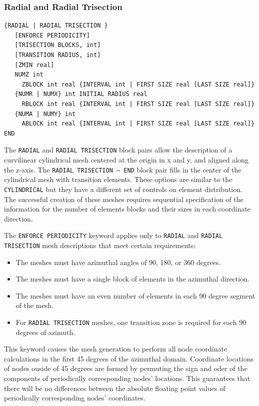 \clearpage
\subsubsection {Radial and Radial Trisection}
{\ttfamily \begin{verbatim}
{RADIAL | RADIAL TRISECTION }
   [ENFORCE PERIODICITY]
   [TRISECTION BLOCKS, int]
   [TRANSITION RADIUS, int]
   [ZMIN real]
   NUMZ int
     ZBLOCK int real {INTERVAL int | FIRST SIZE real [LAST SIZE real]}
   {NUMR | NUMX} int INITIAL RADIUS real 
     RBLOCK int real {INTERVAL int | FIRST SIZE real [LAST SIZE real]}
   {NUMA | NUMY} int
     ABLOCK int real {INTERVAL int | FIRST SIZE real [LAST SIZE real]}
END
\end{verbatim}
}

The \texttt{RADIAL} and \texttt{RADIAL TRISECTION} block pairs allow the description of
a
curvilinear cylindrical mesh centered at the origin in x and y, and
aligned along the z-axis.  The \texttt{RADIAL TRISECTION -- END}
block pair fills in the center of the cylindrical mesh with transition
elements.  These options are similar to the \texttt{CYLINDRICAL}
but they have a different set of controls on element distribution.  The
successful creation of these meshes requires sequential
specification of the information for the number of elements blocks and
their sizes in each coordinate direction. 

The \texttt{ENFORCE PERIODICITY} keyword applies only to \texttt{RADIAL} and \texttt{RADIAL TRISECTION} mesh descriptions that meet certain requirements: 
\begin{itemize}
  	\item The meshes must have azimuthal angles of 90, 180, or 360 degrees.
	\item The meshes must have a single block of elements in the azimuthal direction. 
	\item The meshes must have an even number of elements in each 90 degree segment of the mesh. 
	\item For \texttt{RADIAL TRISECTION} meshes, one transition zone is required for each 90 degrees of azimuth. 
\end{itemize} 

This keyword causes the mesh generation to perform all node coordinate calculations in the first 45 degrees of the azimuthal domain. Coordinate locations of nodes ouside of 45 degrees are formed by permuting the sign and oder of the components of periodically corresponding nodes' locations. This guarantees that there will be no differences between the absolute floating point values of periodically corresponding nodes' coordinates.  

